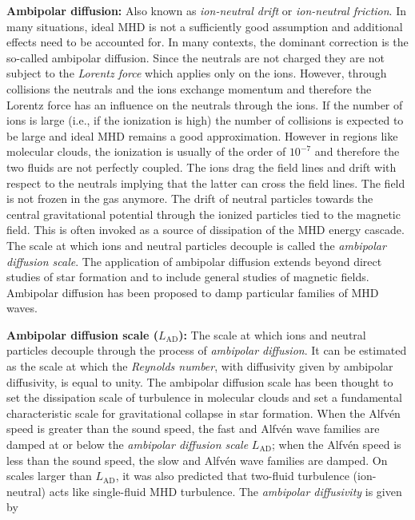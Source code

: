 \documentclass[a4paper,10pt]{article}
\begin{document}
{\noindent}\textbf{Ambipolar diffusion:} Also known as \textit{ion-neutral drift} or \textit{ion-neutral friction}. In many situations, ideal MHD is not a sufficiently good assumption and additional effects need to be accounted for. In many contexts, the dominant correction is the so-called ambipolar diffusion. Since the neutrals are not charged they are not subject to the \textit{Lorentz force} which applies only on the ions. However, through collisions the neutrals and the ions exchange momentum and therefore the Lorentz force has an influence on the neutrals through the ions. If the number of ions is large (i.e., if the ionization is high) the number of collisions is expected to be large and ideal MHD remains a good approximation. However in regions like molecular clouds, the ionization is usually of the order of $10^{-7}$ and therefore the two fluids are not perfectly coupled. The ions drag the field lines and drift with respect to the neutrals implying that the latter can cross the field lines. The field is not frozen in the gas anymore. The drift of neutral particles towards the central gravitational potential through the ionized particles tied to the magnetic field. This is often invoked as a source of dissipation of the MHD energy cascade. The scale at which ions and neutral particles decouple is called the \textit{ambipolar diffusion scale}. The application of ambipolar diffusion extends beyond direct studies of star formation and to include general studies of magnetic fields. Ambipolar diffusion has been proposed to damp particular families of MHD waves. 

{\noindent}\textbf{Ambipolar diffusion scale ($L_\mathrm{AD}$):} The scale at which ions and neutral particles decouple through the process of \textit{ambipolar diffusion}. It can be estimated as the scale at which the \textit{Reynolds number}, with diffusivity given by ambipolar diffusivity, is equal to unity. The ambipolar diffusion scale has been thought to set the dissipation scale of turbulence in molecular clouds and set a fundamental characteristic scale for gravitational collapse in star formation. When the Alfv\'en speed is greater than the sound speed, the fast and Alfv\'en wave families are damped at or below the \textit{ambipolar diffusion scale} $L_\mathrm{AD}$; when the Alfv\'en speed is less than the sound speed, the slow and Alfv\'en wave families are damped. On scales larger than $L_\mathrm{AD}$, it was also predicted that two-fluid turbulence (ion-neutral) acts like single-fluid MHD turbulence. The \textit{ambipolar diffusivity} is given by
\end{document}
